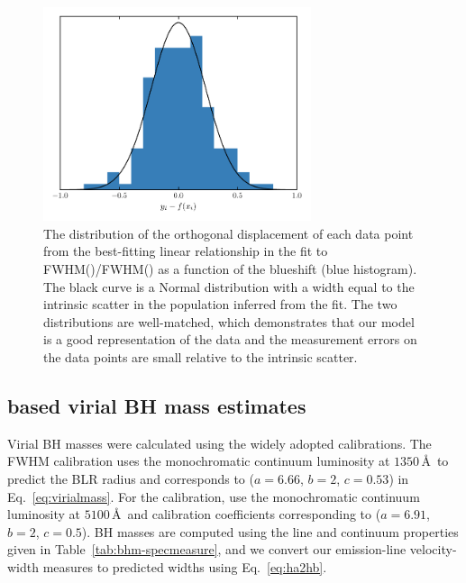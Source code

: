 \begin{figure}[h!]
    \centering 
    \includegraphics[width=0.7\textwidth]{figures/chapter03/intrinsic_scatter.pdf} 
    \caption[{The distribution of the orthogonal displacement of each data point from the best-fitting linear relationship in the fit to FWHM()/FWHM(\hans) as a function of the  blueshift.}]{The distribution of the orthogonal displacement of each data point from the best-fitting linear relationship in the fit to FWHM()/FWHM(\hans) as a function of the  blueshift (blue histogram). The black curve is a Normal distribution with a width equal to the intrinsic scatter in the population inferred from the fit. The two distributions are well-matched, which demonstrates that our model is a good representation of the data and the measurement errors on the data points are small relative to the intrinsic scatter.} 
    \label{fig:intrinsic_scatter}
\end{figure}

\subsection{ based virial BH mass estimates}

Virial BH masses were calculated using the widely adopted \citet{vestergaard06} calibrations. 
The \citet{vestergaard06}  FWHM calibration uses the monochromatic continuum luminosity at $1350$\,\AA\, to predict the BLR radius and corresponds to ($a=6.66$, $b=2$, $c=0.53$) in Eq.~\ref{eq:virialmass}. 
For the \hb calibration, \citet{vestergaard06} use the monochromatic continuum luminosity at $5100$\,\AA\, and calibration coefficients corresponding to ($a=6.91$, $b=2$, $c=0.5$).
BH masses are computed using the line and continuum properties given in Table~\ref{tab:bhm-specmeasure}, and we convert our \ha emission-line velocity-width measures to predicted \hb widths using Eq.~\ref{eq:ha2hb}.

